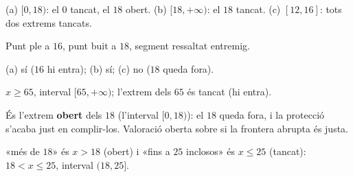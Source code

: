 \begin{solucions}
\begin{sollist}
  \item (a) $[0,18)$: el $0$ tancat, el $18$ obert. \quad
        (b) $[18,+\infty)$: el $18$ tancat. \quad
        (c) $[12,16]$: tots dos extrems tancats.
  \item Punt ple a $16$, punt buit a $18$, segment ressaltat entremig.
  \item (a) sí ($16$ hi entra); \quad (b) sí; \quad (c) no ($18$ queda fora).
  \item $x\ge 65$, interval $[65,+\infty)$; l'extrem dels $65$ és tancat (hi entra).
  \item És l'extrem \textbf{obert} dels $18$ (l'interval $[0,18)$): el $18$ queda fora,
        i la protecció s'acaba just en complir-los. Valoració oberta sobre si la
        frontera abrupta és justa.
  \item «més de $18$» és $x>18$ (obert) i «fins a $25$ inclosos» és $x\le 25$ (tancat):
        $18<x\le 25$, interval $(18,25]$.
\end{sollist}
\end{solucions}
